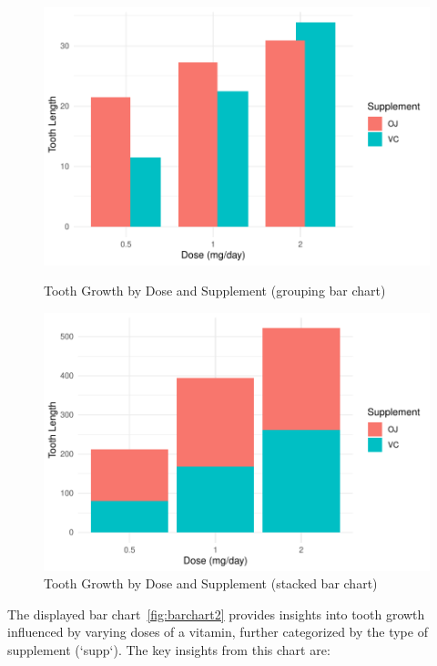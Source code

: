 \documentclass{article}\usepackage[]{graphicx}\usepackage[]{xcolor}
\newenvironment{knitrout}{}{} %
\begin{document}
\begin{figure}[htbp]
  \centering
  \begin{minipage}[b]{0.45\linewidth}
\begin{knitrout}\scriptsize
{}\color{fgcolor}

{\centering \includegraphics[width=\linewidth]{figure/beamer-barchart2-1} 

}


\end{knitrout}
    \caption{Tooth Growth by Dose and Supplement (grouping bar chart)}
    \label{fig:barchart2}
  \end{minipage}
  \hfill
  \begin{minipage}[b]{0.45\linewidth}
\begin{knitrout}\scriptsize
{}\color{fgcolor}

{\centering \includegraphics[width=\linewidth]{figure/beamer-barchart3-1} 

}


\end{knitrout}
    \caption{Tooth Growth by Dose and Supplement (stacked bar chart)}
    \label{fig:barchart3}
  \end{minipage}
\end{figure}
The displayed bar chart~\ref{fig:barchart2} provides insights into tooth growth influenced by varying doses of a vitamin, further categorized by the type of supplement (`supp`). The key insights from this chart are:
\end{document}
